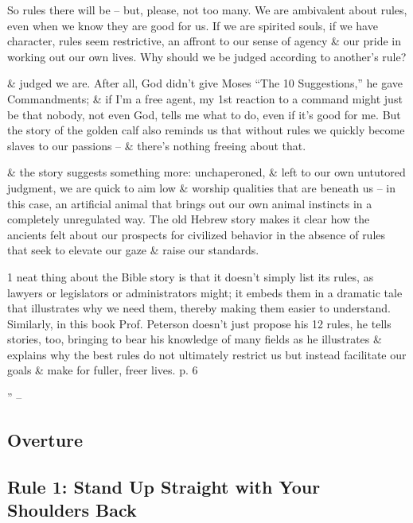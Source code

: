 \documentclass{article}
\begin{document}
So rules there will be -- but, please, not too many. We are ambivalent about rules, even when we know they are good for us. If we are spirited souls, if we have character, rules seem restrictive, an affront to our sense of agency \& our pride in working out our own lives. Why should we be judged according to another's rule?

\& judged we are. After all, God didn't give Moses ``The 10 Suggestions,'' he gave Commandments; \& if I'm a free agent, my 1st reaction to a command might just be that nobody, not even God, tells me what to do, even if it's good for me. But the story of the golden calf also reminds us that without rules we quickly become slaves to our passions -- \& there's nothing freeing about that.

\& the story suggests something more: unchaperoned, \& left to our own untutored judgment, we are quick to aim low \& worship qualities that are beneath us -- in this case, an artificial animal that brings out our own animal instincts in a completely unregulated way. The old Hebrew story makes it clear how the ancients felt about our prospects for civilized behavior in the absence of rules that seek to elevate our gaze \& raise our standards.

1 neat thing about the Bible story is that it doesn't simply list its rules, as lawyers or legislators or administrators might; it embeds them in a dramatic tale that illustrates why we need them, thereby making them easier to understand. Similarly, in this book Prof. Peterson doesn't just propose his 12 rules, he tells stories, too, bringing to bear his knowledge of many fields as he illustrates \& explains why the best rules do not ultimately restrict us but instead facilitate our goals \& make for fuller, freer lives. p. 6

'' -- \cite[pp. 5--]{Peterson2018}




\subsection{Overture}


\subsection{Rule 1: Stand Up Straight with Your Shoulders Back}
\end{document}
